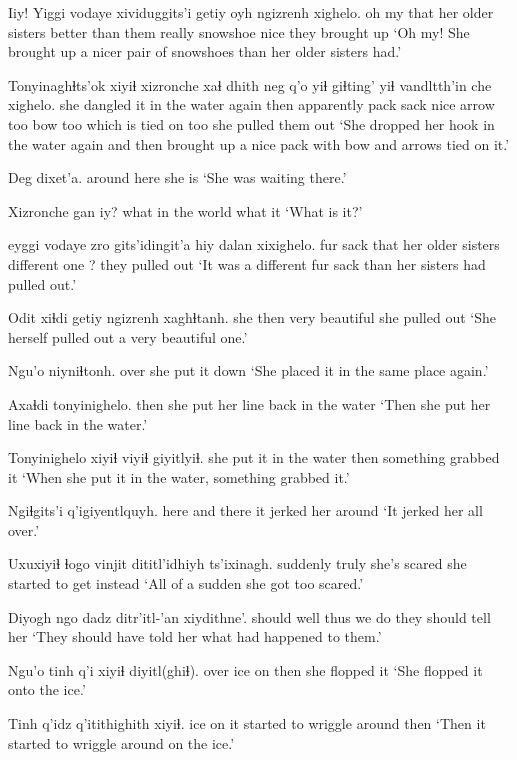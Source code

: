 \documentclass[12pt]{article}
\begin{document}
\gll Iiy! Yiggi vodaye xividuggits'i getiy oyh ngizrenh xighelo.
{oh my} that {her older sisters} {better than them} really snowshoe nice {they brought up}
\glt `Oh my! She brought up a nicer pair of snowshoes than her older sisters had.'
\glend

\gll Tonyinaghɬts'ok xiyiɬ xizronche xaɬ dhith neg q'o yiɬ giɬting' yiɬ vandltth'in che xighelo.
{she dangled it in the water again} then apparently pack sack nice arrow too bow too {which is tied on} too {she pulled them out}
\glt `She dropped her hook in the water again and then brought up a nice pack with bow and arrows tied on it.'
\glend

\gll Deg dixet'a. 
{around here} {she is}
\glt `She was waiting there.'
\glend

\gll Xizronche gan iy?
{what in the world} what it
\glt `What is it?'
\glend

 eyggi vodaye zro {gits'idingit'a hiy} dalan xixighelo.
{fur sack} that {her older sisters} {} {different one} ?  {they pulled out}
\glt `It was a different fur sack than her sisters had pulled out.'
\glend

\gll Odit xiɬdi getiy ngizrenh xaghɬtanh.
she then very beautiful {she pulled out}
\glt `She herself pulled out a very beautiful one.'
\glend

\gll Ngu'o niyniɬtonh. 
over {she put it down}
\glt `She placed it in the same place again.'
\glend

\gll Axaɬdi tonyinighelo. 
then {she put her line back in the water}
\glt `Then she put her line back in the water.'
\glend

\gll Tonyinighelo xiyiɬ {viyiɬ giyitlyiɬ}.
{she put it in the water} then {something grabbed it}
\glt `When she put it in the water, something grabbed it.'
\glend

\gll Ngiɬgits'i q'igiyentlquyh.
{here and there} {it jerked her around}
\glt `It jerked her all over.'
\glend

\gll Uxuxiyiɬ ɬogo vinjit dititl'idhiyh ts'ixinagh.
suddenly truly {she's scared} {she started to get} instead
\glt `All of a sudden she got too scared.'
\glend

\gll Diyogh ngo dadz ditr'itl-'an xiydithne'.
should well thus {we do} {they should tell her}
\glt `They should have told her what had happened to them.'
\glend

\gll Ngu'o tinh q'i xiyiɬ diyitl(ghiɬ). 
over  ice on then {she flopped it}
\glt `She flopped it onto the ice.'
\glend

\gll Tinh q'idz q'itithighith xiyiɬ.
ice on {it started to wriggle around} then
\glt `Then it started to wriggle around on the ice.'
\glend
\end{document}
